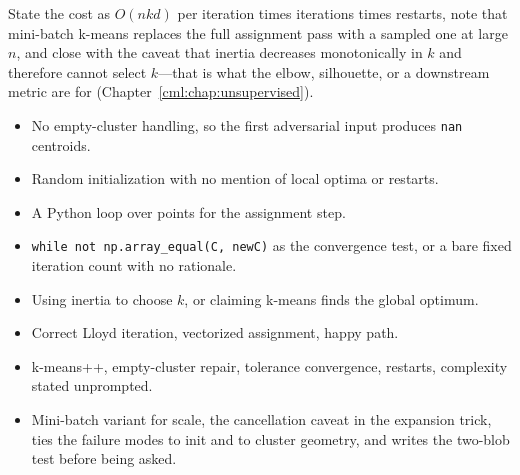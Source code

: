 \begin{interviewq}
State the cost as $O(nkd)$ per iteration times iterations times restarts, note that mini-batch k-means replaces the full assignment pass with a sampled one at large $n$, and close with the caveat that inertia decreases monotonically in $k$ and therefore cannot select $k$---that is what the elbow, silhouette, or a downstream metric are for (Chapter~\ref{cml:chap:unsupervised}).

\redflags
\begin{itemize}
    \item No empty-cluster handling, so the first adversarial input produces \texttt{nan} centroids.
    \item Random initialization with no mention of local optima or restarts.
    \item A Python loop over points for the assignment step.
    \item \texttt{while not np.array\_equal(C, newC)} as the convergence test, or a bare fixed iteration count with no rationale.
    \item Using inertia to choose $k$, or claiming k-means finds the global optimum.
\end{itemize}


\goodgreat
\begin{itemize}
    \item {} Correct Lloyd iteration, vectorized assignment, happy path.
    \item {} k-means++, empty-cluster repair, tolerance convergence, restarts, complexity stated unprompted.
    \item {} Mini-batch variant for scale, the cancellation caveat in the expansion trick, ties the failure modes to init and to cluster geometry, and writes the two-blob test before being asked.
\end{itemize}

\end{interviewq}

